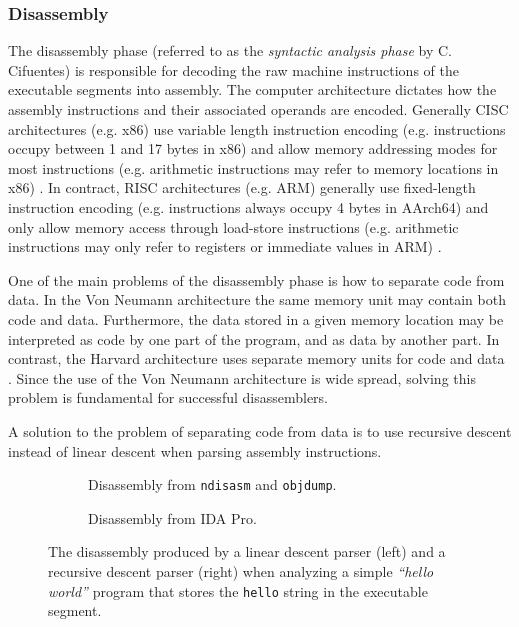 
\subsubsection{Disassembly}

The disassembly phase (referred to as the \textit{syntactic analysis phase} by C. Cifuentes) is responsible for decoding the raw machine instructions of the executable segments into assembly. The computer architecture dictates how the assembly instructions and their associated operands are encoded. Generally CISC architectures (e.g. x86) use variable length instruction encoding (e.g. instructions occupy between 1 and 17 bytes in x86) and allow memory addressing modes for most instructions (e.g. arithmetic instructions may refer to memory locations in x86) \cite{x86_manual}. In contract, RISC architectures (e.g. ARM) generally use fixed-length instruction encoding (e.g. instructions always occupy 4 bytes in AArch64) and only allow memory access through load-store instructions (e.g. arithmetic instructions may only refer to registers or immediate values in ARM) \cite{arm_manual}.

One of the main problems of the disassembly phase is how to separate code from data. In the Von Neumann architecture the same memory unit may contain both code and data. Furthermore, the data stored in a given memory location may be interpreted as code by one part of the program, and as data by another part. In contrast, the Harvard architecture uses separate memory units for code and data \cite{von_neumann_vs_harvard}. Since the use of the Von Neumann architecture is wide spread, solving this problem is fundamental for successful disassemblers.


A solution to the problem of separating code from data is to use recursive descent instead of linear descent when parsing assembly instructions.


\begin{figure}[htbp]
	\centering
	\begin{subfigure}[t]{0.49\textwidth}
		
		\caption{Disassembly from \texttt{ndisasm} and \texttt{objdump}.}
	\end{subfigure}
	\qquad
	\begin{subfigure}[t]{0.35\textwidth}
		
		\caption{Disassembly from IDA Pro.}
	\end{subfigure}
	\caption{The disassembly produced by a linear descent parser (left) and a recursive descent parser (right) when analyzing a simple \textit{``hello world''} program that stores the \texttt{hello} string in the executable segment.}
\end{figure}

